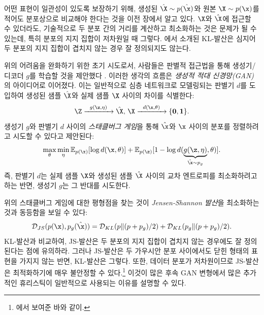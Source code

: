 \documentclass[../../book-main_ko.tex]{subfiles}
\begin{document}
어떤 표현이 일관성이 있도록 보장하기 위해, 생성된 $\hat \X \sim p(\hat\x)$와 원본 $\X \sim p(\x)$를 적어도 분포상으로 비교해야 한다는 것을 이전 장에서 알고 있다. $\X$와 $\hat \X$에 접근할 수 있더라도, 기술적으로 두 분포 간의 거리를 계산하고 최소화하는 것은 문제가 될 수 있는데, 특히 분포의 지지 집합이 저차원일 때 그렇다. 에서 소개된 KL-발산은 심지어 두 분포의 지지 집합이 겹치지 않는 경우 잘 정의되지도 않는다.

위의 어려움을 완화하기 위한 초기 시도로서, 사람들은 판별적 접근법을 통해 생성기/디코더 $g$를 학습할 것을 제안했다 \cite{Tu-2007}. 이러한 생각의 흐름은 {\em 생성적 적대 신경망(GAN)} \cite{goodfellow2014generative}의 아이디어로 이어졌다. 이는 일반적으로 심층 네트워크로 모델링되는 판별기 $d$를 도입하여 생성된 샘플 $\hat \X$와 실제 샘플 $\X$ 사이의 차이를 식별한다:
\begin{equation}
 \Z \xrightarrow{\hspace{2mm} g(\z,\eta) \hspace{2mm}} \hat \X, \, \X \xrightarrow{\hspace{2mm} d(\x, \theta)\hspace{2mm}} \{\mathbf 0, \mathbf 1\}.
 \label{eqn:GAN}
\end{equation}
생성기 $g$와 판별기 $d$ 사이의 {\em 스태클버그 게임}을 통해 $\hat \x$와 $\x$ 사이의 분포를 정렬하려고 시도할 수 있다고 제안된다:
\begin{equation}
\max_{\theta}\min_{\eta} \mathbb{E}_{p({\x})}[\log d(\x,\theta)] + \mathbb{E}_{p({\z})}[1 - \log d(\underbrace{g(\z,\eta)}_{\hat \x \sim p_g},\theta)].
\end{equation}
즉, 판별기 $d$는 실제 샘플 $\X$와 생성된 샘플 $\hat \X$ 사이의 교차 엔트로피를 최소화하려고 하는 반면, 생성기 $g$는 그 반대를 시도한다.

위의 스태클버그 게임에 대한 평형점을 찾는 것이 {\em Jensen-Shannon 발산}을 최소화하는 것과 동등함을 보일 수 있다:
\begin{equation}
    \mathcal{D}_{JS}(p(\x), p_g(\hat \x)) = \mathcal{D}_{KL}(p \| (p + p_g)/{2}) + \mathcal{D}_{KL}(p_g \| (p + p_g)/{2}).
\end{equation}
KL-발산과 비교하여, JS-발산은 두 분포의 지지 집합이 겹치지 않는 경우에도 잘 정의된다는 점에 유의하라. 그러나 JS-발산은 두 가우시안 분포 사이에서도 닫힌 형태의 표현을 가지지 않는 반면, KL-발산은 그렇다. 또한, 데이터 분포가 저차원이므로 JS-발산은 최적화하기에 매우 불안정할 수 있다.\footnote{\cite{arjovsky2017wasserstein}에서 보여준 바와 같이.} 이것이 많은 후속 GAN 변형에서 많은 추가적인 휴리스틱이 일반적으로 사용되는 이유를 설명할 수 있다.
\end{document}
